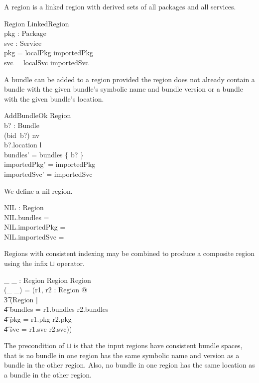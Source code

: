 \documentclass[a4paper,9pt]{article}
\begin{document}
A region is a linked region with derived sets of all packages and all services.
\begin{schema}{Region}
  LinkedRegion \\
  pkg : \power Package \\
  svc : \power Service \\
\where
  pkg = localPkg \cup importedPkg \\
  svc = localSvc \cup importedSvc \\
\end{schema}

A bundle can be added to a region provided the region does not already contain a bundle with
the given bundle's symbolic name and bundle version or a bundle with the given bundle's location.
\begin{schema}{AddBundleOk}
  \Delta Region \\
  b? : Bundle \\
\where
  (bid~b?) \notin \dom nv \\
  b?.location \notin \dom l \\
  bundles' = bundles \cup \{ b? \} \\
  importedPkg' = importedPkg \\
  importedSvc' = importedSvc \\
\end{schema}

We define a nil region.
\begin{axdef}
  NIL : Region \\
\where
 NIL.bundles = \emptyset \\
 NIL.importedPkg = \emptyset \\
 NIL.importedSvc = \emptyset \\
 \end{axdef}

Regions with consistent indexing may be combined to produce a composite region using the infix $\sqcup$ operator.
\begin{axdef}
 \_ \sqcup \_ : Region \cross Region \pfun Region \\
\where
 (\_ \sqcup \_) = (\lambda r1, r2 : Region @ \\
\t3 (\mu Region | \\
\t4 bundles = r1.bundles \cup r2.bundles \land \\
\t4 pkg = r1.pkg \cup r2.pkg \land \\
\t4 svc = r1.svc \cup r2.svc)) \\
\end{axdef}
The precondition of $\sqcup$ is that the input regions have consistent bundle spaces, that is no bundle in one
region has the same symbolic name and version as a bundle in the other region.
Also, no bundle in one region has the same location as a bundle in the other region.
\end{document}
